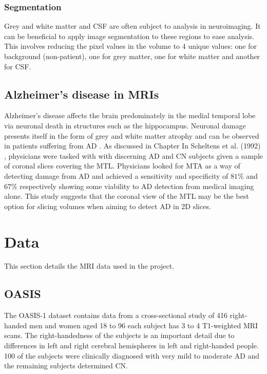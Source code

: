 \documentclass[
    author={Kai Hulme},
    supervisor={Dr Jon Bird},
    degree={BSc},
    title={Generative Adversarial Networks as an Augmentation Technique},
    subtitle={for Alzheimer's Disease Detection in MRI Volumes},
    type={Research},
    year={2021} 
]{dissertation}
\begin{document}
\subsubsection{Segmentation}

Grey and white matter and CSF are often subject to analysis in neuroimaging. It can be beneficial to apply image segmentation to these regions to ease analysis. This involves reducing the pixel values in the volume to 4 unique values: one for background (non-patient), one for grey matter, one for white matter and another for CSF.

\subsection{Alzheimer's disease in MRIs}
\label{ad_in_mris}

Alzheimer's disease affects the brain predominately in the medial temporal lobe via neuronal death in structures such as the hippocampus. Neuronal damage presents itself in the form of grey and white matter atrophy and can be observed in patients suffering from AD \cite{weller2018current}. As discussed in Chapter In Scheltens et al. (1992) \cite{scheltens1992atrophy} , physicians were tasked with with discerning AD and CN subjects given a sample of coronal slices covering the MTL. Physicians looked for MTA as a way of detecting damage from AD and achieved a sensitivity and specificity of $81\%$ and $67\%$ respectively showing some viability to AD detection from medical imaging alone. This study suggests that the coronal view of the MTL may be the best option for slicing volumes when aiming to detect AD in 2D slices.

	
		
\section{Data}

This section details the MRI data used in the project.  

\subsection{OASIS}

The OASIS-1 dataset contains data from a cross-sectional study of 416 right-handed men and women aged 18 to 96 each subject has 3 to 4 T1-weighted MRI scans. The right-handedness of the subjects is an important detail due to differences in left and right cerebral hemispheres in left and right-handed people. 100 of the subjects were clinically diagnosed with very mild to moderate AD and the remaining subjects determined CN.
\end{document}
